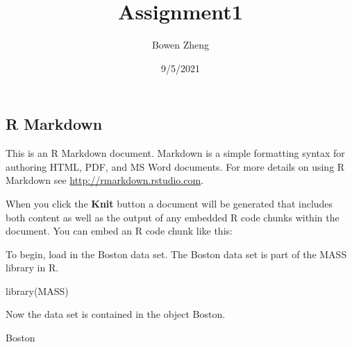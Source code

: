 \documentclass[
]{article}
\title{Assignment1}
\author{Bowen Zheng}
\date{9/5/2021}
\newenvironment{Shaded}{\begin{snugshade}}{\end{snugshade}}
\newcommand{\FunctionTok}[1]{\textcolor[rgb]{0.00,0.00,0.00}{#1}}
\newcommand{\NormalTok}[1]{#1}
\begin{document}
\maketitle

\hypertarget{r-markdown}{%
\subsection{R Markdown}\label{r-markdown}}

This is an R Markdown document. Markdown is a simple formatting syntax
for authoring HTML, PDF, and MS Word documents. For more details on
using R Markdown see \url{http://rmarkdown.rstudio.com}.

When you click the \textbf{Knit} button a document will be generated
that includes both content as well as the output of any embedded R code
chunks within the document. You can embed an R code chunk like this:

To begin, load in the Boston data set. The Boston data set is part of
the MASS library in R.

\begin{Shaded}
\begin{Highlighting}[]
\FunctionTok{library}\NormalTok{(MASS)}
\end{Highlighting}
\end{Shaded}

Now the data set is contained in the object Boston.

\begin{Shaded}
\begin{Highlighting}[]
\NormalTok{Boston}
\end{Highlighting}
\end{Shaded}
\end{document}
